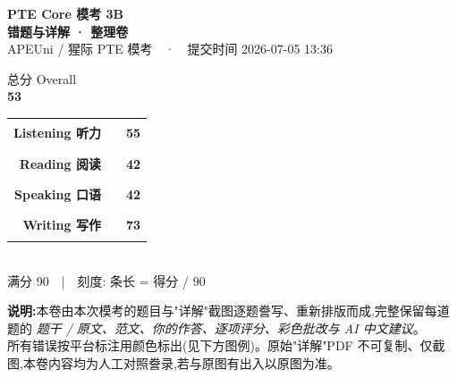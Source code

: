 
\begin{titlepage}
\thispagestyle{empty}
\centering
\vspace*{1.4cm}

{\fontsize{30}{36}\selectfont\bfseries\color{cHead} PTE Core 模考 3B}\\[4mm]
{\fontsize{17}{20}\selectfont\color{cAccent}\bfseries 错题与详解 · 整理卷}\\[3mm]
{\color{gray} APEUni / 猩际 PTE 模考　·　提交时间 2026-07-05 13:36}\\[1.2cm]

\begin{tcolorbox}[width=0.62\textwidth, halign=center, enhanced,
  colback=cAccent, colframe=cAccent, arc=6pt, boxrule=0pt, top=10pt, bottom=10pt]
  {\color{white}\large 总分 Overall}\\[2pt]
  {\fontsize{46}{50}\selectfont\bfseries\color{white} 53}
\end{tcolorbox}

\vspace{1.0cm}

\begin{tcolorbox}[width=0.84\textwidth, enhanced, colback=white, colframe=cRule,
  boxrule=0.8pt, arc=4pt, left=18pt, right=18pt, top=14pt, bottom=14pt]
\setlength{\tabcolsep}{6pt}\renewcommand{\arraystretch}{1.7}
\sffamily
\begin{tabular}{@{}r@{\hskip 8pt}l@{\hskip 10pt}l@{}}
 \bfseries Listening 听力 & {\color{mListen}\rule{6.11cm}{0.42cm}} & {\bfseries\large 55}\\
 \bfseries Reading 阅读   & {\color{mRead}\rule{4.67cm}{0.42cm}}   & {\bfseries\large 42}\\
 \bfseries Speaking 口语  & {\color{mSpeak}\rule{4.67cm}{0.42cm}}  & {\bfseries\large 42}\\
 \bfseries Writing 写作   & {\color{mWrite}\rule{8.11cm}{0.42cm}}  & {\bfseries\large 73}\\
\end{tabular}\\[2mm]
{\footnotesize\color{gray} 满分 90　|　刻度: 条长 = 得分 / 90}
\end{tcolorbox}

\vfill
\begin{flushleft}\small\color{gray}
\textbf{说明:}本卷由本次模考的题目与"详解"截图逐题誊写、重新排版而成,完整保留每道题的
\emph{题干 / 原文、范文、你的作答、逐项评分、彩色批改与 AI 中文建议}。\\
所有错误按平台标注用颜色标出(见下方图例)。原始"详解"PDF 不可复制、仅截图,本卷内容均为人工对照誊录,若与原图有出入以原图为准。
\end{flushleft}
\vspace{4mm}
\ptelegend
\end{titlepage}
